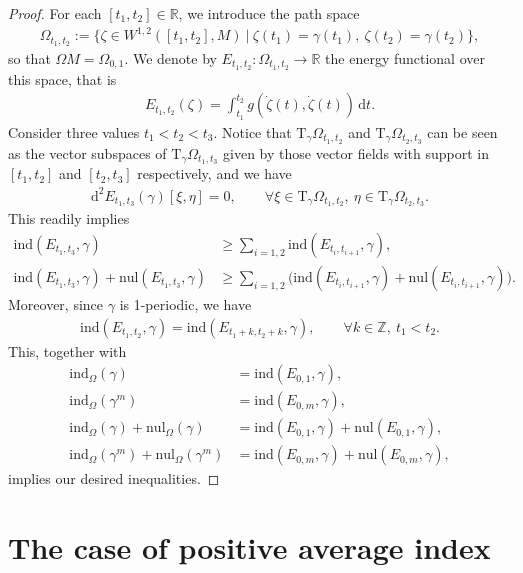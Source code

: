 \documentclass[reqno]{amsart}
\numberwithin{equation}{section}
\theoremstyle{personal}%
\theoremstyle{definition}
\newcommand{\Z}{\mathds{Z}}
\newcommand{\R}{\mathds{R}}
\newcommand{\diff}{\mathrm{d}}
\newcommand{\Tan}{\mathrm{T}}
\newcommand{\ind}{\mathrm{ind}}
\newcommand{\nul}{\mathrm{nul}}
\begin{document}
\begin{proof}
For each $[t_1,t_2]\in\R$, we introduce the path space
\begin{align*}
\Omega_{t_1,t_2} := \big\{ \zeta\in W^{1,2}([t_1,t_2],M)\ \big|\ \zeta(t_1)=\gamma(t_1),\ \zeta(t_2)=\gamma(t_2)\big\},
\end{align*}
so that $\Omega M=\Omega_{0,1}$. We denote by $E_{t_1,t_2}:\Omega_{t_1,t_2}\to\R$ the energy functional over this space, that is
\begin{align*}
E_{t_1,t_2}(\zeta) = \int_{t_1}^{t_2} g(\dot\zeta(t),\dot\zeta(t))\,\diff t.
\end{align*}
Consider three values $t_1<t_2<t_3$. Notice that  $\Tan_\gamma\Omega_{t_1,t_2}$ and $\Tan_\gamma\Omega_{t_2,t_3}$ can be seen as the vector subspaces of $\Tan_\gamma\Omega_{t_1,t_3}$ given by those vector fields with support in $[t_1,t_2]$ and $[t_2,t_3]$ respectively, and we have
\begin{align*}
\diff^2E_{t_1,t_3}(\gamma)[\xi,\eta]=0,
\qquad
\forall \xi\in\Tan_\gamma\Omega_{t_1,t_2},\ \eta\in\Tan_\gamma\Omega_{t_2,t_3}.
\end{align*}
This readily implies 
\begin{align*}
\ind(E_{t_1,t_3},\gamma) & \geq \sum_{i=1,2} \ind(E_{t_i,t_{i+1}},\gamma),\\
\ind(E_{t_1,t_3},\gamma)+\nul(E_{t_1,t_3},\gamma) & \geq \sum_{i=1,2} \Big( \ind(E_{t_i,t_{i+1}},\gamma)+\nul(E_{t_i,t_{i+1}},\gamma) \Big).
\end{align*}
Moreover, since $\gamma$ is 1-periodic, we have 
\begin{align*}
 \ind(E_{t_1,t_2},\gamma)=\ind(E_{t_1+k,t_2+k},\gamma),
 \qquad
 \forall k\in\Z,\ t_1<t_2.
\end{align*}
This, together with 
\begin{align*}
 \ind_\Omega(\gamma) & = \ind(E_{0,1},\gamma),\\
 \ind_\Omega(\gamma^m) & = \ind(E_{0,m},\gamma),\\
 \ind_\Omega(\gamma)+\nul_\Omega(\gamma) & = \ind(E_{0,1},\gamma)+\nul(E_{0,1},\gamma),\\ 
 \ind_\Omega(\gamma^m)+\nul_\Omega(\gamma^m) & = \ind(E_{0,m},\gamma)+\nul(E_{0,m},\gamma), 
\end{align*}
implies our desired inequalities.
\end{proof}




\section{The case of positive average index}
\label{s:avind_positive}
\end{document}

